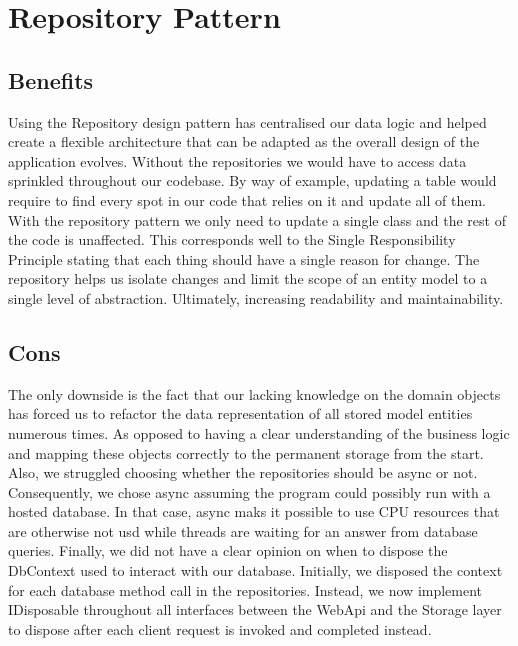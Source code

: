 \section{Repository Pattern}

\subsection{Benefits}
Using the Repository design pattern has centralised our data logic and helped create a flexible architecture that can be adapted as the overall design of the application evolves. Without the repositories we would have to access data sprinkled throughout our codebase. By way of example, updating a table would require to find every spot in our code that relies on it and update all of them. With the repository pattern we only need to update a single class and the rest of the code is unaffected. This corresponds well to the Single Responsibility Principle stating that each thing should have a single reason for change. The repository helps us isolate changes and limit the scope of an entity model to a single level of abstraction. Ultimately, increasing readability and maintainability. 

\subsection{Cons}
The only downside is the fact that our lacking knowledge on the domain objects has forced us to refactor the data representation of all stored model entities numerous times. As opposed to having a clear understanding of the business logic and mapping these objects correctly to the permanent storage from the start. Also, we struggled choosing whether the repositories should be async or not. Consequently, we chose async assuming the program could possibly run with a hosted database. In that case, async maks it possible to use CPU resources that are otherwise not usd while threads are waiting for an answer from database queries. Finally, we did not have a clear opinion on when to dispose the DbContext used to interact with our database. Initially, we disposed the context for each database method call in the repositories. Instead, we now implement IDisposable throughout all interfaces between the WebApi and the Storage layer to dispose after each client request is invoked and completed instead. 

 
